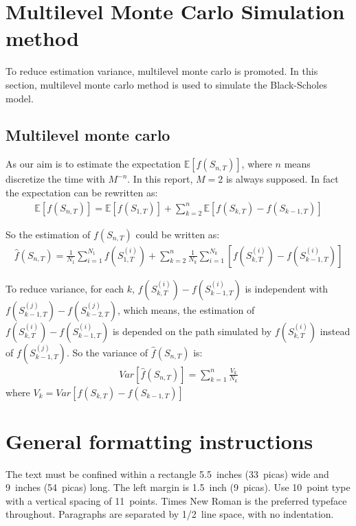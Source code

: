 \documentclass{article} %
\begin{document}
\section{Multilevel Monte Carlo Simulation method}

To reduce estimation variance, multilevel monte carlo is promoted. In this section, multilevel monte carlo method is used to simulate the Black-Scholes model.

\subsection{Multilevel monte carlo}

As our aim is to estimate the expectation $\mathbb{E}[f(S_{n, T})]$, where $n$ means discretize the time with $M^{-n}$. In this report, $M=2$ is always supposed. In fact the expectation can be rewritten as:
\begin{align}
  \mathbb{E}[f(S_{n, T})]=\mathbb{E}[f(S_{1, T})] + \sum_{k=2}^{n}\mathbb{E}[f(S_{k, T})-f(S_{k-1, T})]
\end{align}

So the estimation of $f(S_{n, T})$ could be written as:
\begin{align}
  \widehat{f}(S_{n, T})=\frac{1}{N_{1}}\sum_{i=1}^{N_{1}}f(S_{1, T}^{(i)})+\sum_{k=2}^{n}\frac{1}{N_{k}}\sum_{i=1}^{N_{k}}[f(S_{k, T}^{(i)})-f(S_{k-1, T}^{(i)})]
\end{align}

To reduce variance, for each $k$, $f(S_{k,T}^{(i)})-f(S_{k-1,T}^{(i)})$ is independent with $f(S_{k-1,T}^{(j)})-f(S_{k-2,T}^{(j)})$, which means, the estimation of $f(S_{k,T}^{(i)})-f(S_{k-1,T}^{(i)})$ is depended on the path simulated by $f(S_{k, T}^{(i)})$ instead of $f(S_{k-1, T}^{(j)})$. So the variance of $\widehat{f}(S_{n, T})$ is:
\begin{align}
  Var[\widehat{f}(S_{n, T})]=\sum_{k=1}^{n}\frac{V_{k}}{N_{k}}
\end{align}
where $V_{k}=Var[f(S_{k, T})-f(S_{k-1, T})]$


\section{General formatting instructions}
\label{gen_inst}

The text must be confined within a rectangle 5.5~inches (33~picas) wide and
9~inches (54~picas) long. The left margin is 1.5~inch (9~picas).
Use 10~point type with a vertical spacing of 11~points. Times New Roman is the
preferred typeface throughout. Paragraphs are separated by 1/2~line space,
with no indentation.
\end{document}
